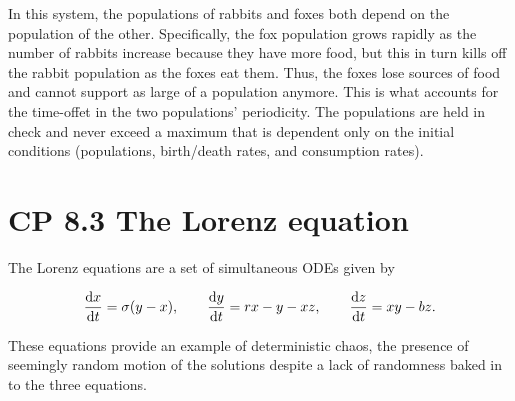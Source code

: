 \documentclass[11pt]{article}
\begin{document}
    In this system, the populations of rabbits and foxes both depend on the
population of the other. Specifically, the fox population grows rapidly
as the number of rabbits increase because they have more food, but this
in turn kills off the rabbit population as the foxes eat them. Thus, the
foxes lose sources of food and cannot support as large of a population
anymore. This is what accounts for the time-offet in the two
populations' periodicity. The populations are held in check and never
exceed a maximum that is dependent only on the initial conditions
(populations, birth/death rates, and consumption rates).

    \section{CP 8.3 The Lorenz equation}\label{cp-8.3-the-lorenz-equation}

The Lorenz equations are a set of simultaneous ODEs given by

\[{\text{d} x\over\text{d} t} = \sigma(y-x),\qquad
{\text{d} y\over\text{d} t} = rx - y - xz,\qquad
{\text{d} z\over\text{d} t} = xy - bz.
\]

These equations provide an example of deterministic chaos, the presence
of seemingly random motion of the solutions despite a lack of randomness
baked in to the three equations.
\end{document}
